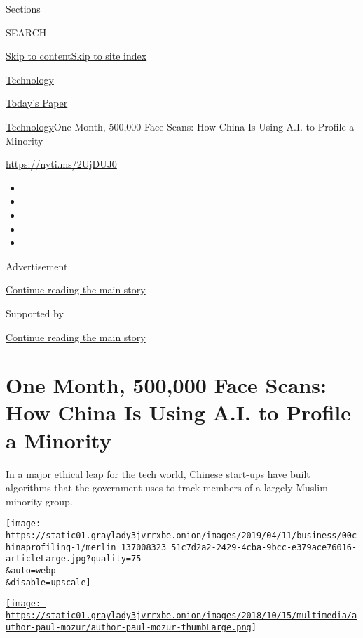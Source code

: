 Sections

SEARCH

\protect\hyperlink{site-content}{Skip to
content}\protect\hyperlink{site-index}{Skip to site index}

\href{https://www.nytimes3xbfgragh.onion/section/technology}{Technology}

\href{https://myaccount.nytimes3xbfgragh.onion/auth/login?response_type=cookie\&client_id=vi}{}

\href{https://www.nytimes3xbfgragh.onion/section/todayspaper}{Today's
Paper}

\href{/section/technology}{Technology}\textbar{}One Month, 500,000 Face
Scans: How China Is Using A.I. to Profile a Minority

\url{https://nyti.ms/2UjDUJ0}

\begin{itemize}
\item
\item
\item
\item
\item
\end{itemize}

Advertisement

\protect\hyperlink{after-top}{Continue reading the main story}

Supported by

\protect\hyperlink{after-sponsor}{Continue reading the main story}

\hypertarget{one-month-500000-face-scans-how-china-is-using-ai-to-profile-a-minority}{%
\section{One Month, 500,000 Face Scans: How China Is Using A.I. to
Profile a
Minority}\label{one-month-500000-face-scans-how-china-is-using-ai-to-profile-a-minority}}

In a major ethical leap for the tech world, Chinese start-ups have built
algorithms that the government uses to track members of a largely Muslim
minority group.

\texttt{[image: https://static01.graylady3jvrrxbe.onion/images/2019/04/11/business/00chinaprofiling-1/merlin\_137008323\_51c7d2a2-2429-4cba-9bcc-e379ace76016-articleLarge.jpg?quality=75\\\&auto=webp\\\&disable=upscale]}

\href{https://www.nytimes3xbfgragh.onion/by/paul-mozur}{\texttt{[image: https://static01.graylady3jvrrxbe.onion/images/2018/10/15/multimedia/author-paul-mozur/author-paul-mozur-thumbLarge.png]}}

